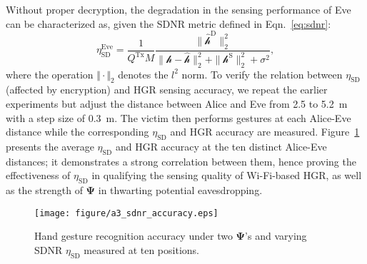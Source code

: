 \documentclass[conference,compsoc]{IEEEtran}
\newcommand{\rev}[1]{{\color{blue}#1}}      %
\newcommand{\newrev}[1]{{\color{blue}#1}}    %
\newcommand{\rev}[1]{#1}
\newcommand{\newrev}[1]{#1}
\begin{document}
Without proper \newrev{decryption}, the degradation in the sensing performance of Eve can be characterized as, given the SDNR metric defined in Eqn.~\eqref{eq:sdnr}:
\vspace{-1ex}
%
\begin{equation} \label{eq:naMIMO}
	\eta_{\mathrm{SD}}^{\mathrm{Eve}} = \frac{1}{Q^{\mathrm{Tx}}M} 
        \frac{ \|\hat{\bm{\mathcal{h}}}^{\mathrm{D}} \|^2_2 } { \| \bm{\mathcal{h}} - \hat{\bm{\mathcal{h}}} \|_2^2 +\| \bm{\mathcal{h}}^{\mathrm{S}} \|^2_2 +  \sigma^2 },
\end{equation}
%
%
where the operation $\Vert \cdot \Vert_2$ denotes the $l^2$ norm. 
%
To verify the relation between $\eta_{\text{SD}}$ (affected by \newrev{encryption}) and HGR sensing accuracy, we repeat the earlier experiments but adjust the distance between Alice and Eve from 2.5 to 5.2~\!m with a step size of 0.3~\!m. The victim then performs gestures at each Alice-Eve distance while the corresponding $\eta_{\mathrm{SD}}$ and HGR accuracy are measured. Figure~\ref{sfig:ssnr_accuracy} presents the average $\eta_{\mathrm{SD}}$ and HGR accuracy at the ten distinct Alice-Eve distances; it demonstrates a strong correlation between them, hence 
proving the effectiveness of $\eta_{\mathrm{SD}}$ in qualifying the sensing quality of Wi-Fi-based HGR, as well as the strength of $\bm{\Psi}$ in thwarting potential eavesdropping.
%
\begin{figure}[b]
    \setlength\abovecaptionskip{8pt}
    \vspace{-1ex}
	\centering
	\texttt{[image: figure/a3\_sdnr\_accuracy.eps]}
	\caption{Hand gesture recognition accuracy under two $\bm{\Psi}$'s and varying SDNR $\eta_{\mathrm{SD}}$ measured at ten positions.} 
	\label{sfig:ssnr_accuracy}
	\vspace{-.5ex}
\end{figure}
%
\end{document}
